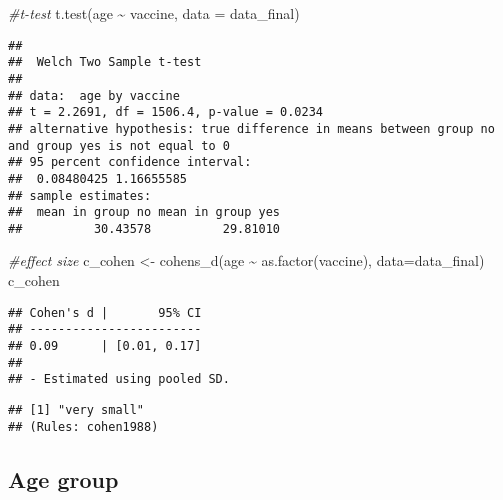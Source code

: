 \documentclass[
]{article}
\newenvironment{Shaded}{\begin{snugshade}}{\end{snugshade}}
\newcommand{\AttributeTok}[1]{\textcolor[rgb]{0.77,0.63,0.00}{#1}}
\newcommand{\CommentTok}[1]{\textcolor[rgb]{0.56,0.35,0.01}{\textit{#1}}}
\newcommand{\FunctionTok}[1]{\textcolor[rgb]{0.00,0.00,0.00}{#1}}
\newcommand{\NormalTok}[1]{#1}
\newcommand{\OtherTok}[1]{\textcolor[rgb]{0.56,0.35,0.01}{#1}}
\newcommand{\SpecialCharTok}[1]{\textcolor[rgb]{0.00,0.00,0.00}{#1}}
\newcommand{\StringTok}[1]{\textcolor[rgb]{0.31,0.60,0.02}{#1}}
\begin{document}
\begin{Shaded}
\begin{Highlighting}[]
\CommentTok{\#t{-}test}
\FunctionTok{t.test}\NormalTok{(age }\SpecialCharTok{\textasciitilde{}}\NormalTok{ vaccine, }\AttributeTok{data =}\NormalTok{ data\_final)}
\end{Highlighting}
\end{Shaded}

\begin{verbatim}
## 
##  Welch Two Sample t-test
## 
## data:  age by vaccine
## t = 2.2691, df = 1506.4, p-value = 0.0234
## alternative hypothesis: true difference in means between group no and group yes is not equal to 0
## 95 percent confidence interval:
##  0.08480425 1.16655585
## sample estimates:
##  mean in group no mean in group yes 
##          30.43578          29.81010
\end{verbatim}

\begin{Shaded}
\begin{Highlighting}[]
\CommentTok{\#effect size}
\NormalTok{c\_cohen }\OtherTok{\textless{}{-}} \FunctionTok{cohens\_d}\NormalTok{(age }\SpecialCharTok{\textasciitilde{}} \FunctionTok{as.factor}\NormalTok{(vaccine), }\AttributeTok{data=}\NormalTok{data\_final)}
\NormalTok{c\_cohen}
\end{Highlighting}
\end{Shaded}

\begin{verbatim}
## Cohen's d |       95% CI
## ------------------------
## 0.09      | [0.01, 0.17]
## 
## - Estimated using pooled SD.
\end{verbatim}

\begin{Shaded}
\end{Shaded}

\begin{verbatim}
## [1] "very small"
## (Rules: cohen1988)
\end{verbatim}

\hypertarget{age-group}{%
\subsection{Age group}\label{age-group}}
\end{document}
